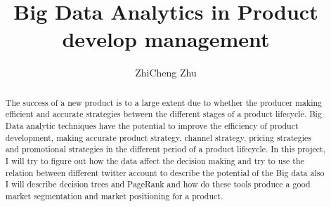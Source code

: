 \documentclass[sigconf]{acmart}
\begin{document}
\title{Big Data Analytics in Product develop management}


\author{ZhiCheng Zhu}


\begin{abstract}
    The success of a new product is to a large extent due to whether the producer making efficient and accurate strategies between the different stages of a product lifecycle. Big Data analytic techniques have the potential to improve the efficiency of product development, making accurate product strategy, channel strategy, pricing strategies and promotional strategies in the different period of a product lifecycle. In this project, I will try to figure out how the data affect the decision making and try to use the relation between different twitter account to describe the potential of the Big data also I will describe decision trees and PageRank and how do these tools produce a good market segmentation and market positioning for a product.
    
\end{abstract}


\maketitle
\end{document}
